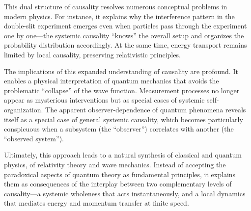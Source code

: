 This dual structure of causality resolves numerous conceptual problems in modern physics. For instance, it explains why the interference pattern in the double-slit experiment
emerges even when particles pass through the experiment one by one—the systemic causality \enquote{knows} the overall setup and organizes the probability distribution
accordingly. At the same time, energy transport remains limited by local causality, preserving relativistic principles.

The implications of this expanded understanding of causality are profound. It enables a physical interpretation of quantum mechanics that avoids the problematic
\enquote{collapse} of the wave function. Measurement processes no longer appear as mysterious interventions but as special cases of systemic self-organization.
The apparent observer-dependence of quantum phenomena reveals itself as a special case of general systemic causality, which becomes particularly conspicuous when
a subsystem (the \enquote{observer}) correlates with another (the \enquote{observed system}).

Ultimately, this approach leads to a natural synthesis of classical and quantum physics, of relativity theory and wave mechanics. Instead of accepting the paradoxical aspects of quantum theory
as fundamental principles, it explains them as consequences of the interplay between two complementary levels of causality—a systemic wholeness that acts instantaneously,
and a local dynamics that mediates energy and momentum transfer at finite speed.